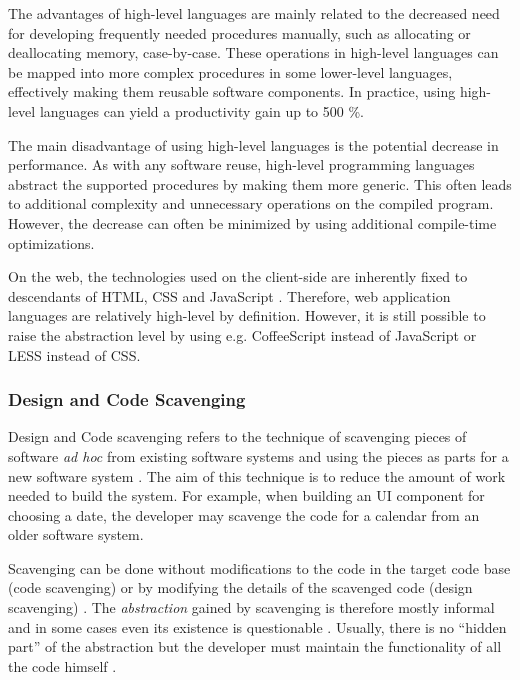 The advantages of high-level languages are mainly related to the decreased need for developing frequently needed procedures manually, such as allocating or deallocating memory, case-by-case. These operations in high-level languages can be mapped into more complex procedures in some lower-level languages, effectively making them reusable software components. In practice, using high-level languages can yield a productivity gain up to 500 \%. \citep[chap.~3]{krueger_software_1992}

The main disadvantage of using high-level languages is the potential decrease in performance. As with any software reuse, high-level programming languages abstract the supported procedures by making them more generic. This often leads to additional complexity and unnecessary operations on the compiled program. However, the decrease can often be minimized by using additional compile-time optimizations. \citep{carro_high-level_2006}

On the web, the technologies used on the client-side are inherently fixed to descendants of HTML, CSS and JavaScript \citep{world_wide_web_consortium_html5_2014,world_wide_web_consortium_cascading_2011,ecma_ecmascript_2011}. Therefore, web application languages are relatively high-level by definition. However, it is still possible to raise the abstraction level by using e.g. CoffeeScript \citep{ashkenas_coffeescript_2009} instead of JavaScript or LESS \citep{sellier_less_2009} instead of CSS.

\subsubsection{Design and Code Scavenging}

Design and Code scavenging refers to the technique of scavenging pieces of software \emph{ad hoc} from existing software systems and using the pieces as parts for a new software system  \citep[chap.~4]{krueger_software_1992}. The aim of this technique is to reduce the amount of work needed to build the system. For example, when building an UI component for choosing a date, the developer may scavenge the code for a calendar from an older software system.

Scavenging can be done without modifications to the code in the target code base (code scavenging) or by modifying the details of the scavenged code (design scavenging) \citep[chap.~4]{krueger_software_1992}. The \emph{abstraction} gained by scavenging is therefore mostly informal and in some cases even its existence is questionable \citep[chap.~3]{sametinger_software_1997}. Usually, there is no ``hidden part'' of the abstraction but the developer must maintain the functionality of all the code himself \citep[chap.~3]{sametinger_software_1997}.

